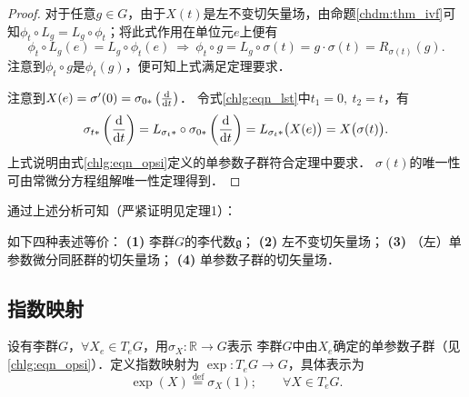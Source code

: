 \begin{proof}
对于任意$g\in G$，由于$X(t)$是左不变切矢量场，由命题\ref{chdm:thm_ivf}可
知$\phi_t\circ L_g = L_g\circ \phi_t$；将此式作用在单位元$e$上便有
\begin{equation}
    \phi_t\circ L_g (e)= L_g\circ \phi_t (e) {\ \Rightarrow \ }
    \phi_t\circ g= L_g\circ \sigma(t) = g\cdot \sigma(t) = R_{\sigma(t)}(g).
\end{equation}
注意到$\phi_t\circ g$是$\phi_t(g)$，便可知上式满足定理要求．

    注意到$X(e)=\sigma'(0)=\sigma_{0*}\left(\frac{{\rm d}}{{\rm d}t}\right)$．
令式\eqref{chlg:eqn_lst}中$t_1=0,\ t_2=t$，有
\begin{equation}
    \sigma_{t*}\left( \frac{{\rm d}}{{\rm d}t}\right) 
    =L_{\sigma_{t}*}\circ\sigma_{0*}\left(\frac{{\rm d}}{{\rm d}t}\right)
    =L_{\sigma_{t}*}\bigl(X(e)\bigr) = X\bigl(\sigma(t)\bigr).
\end{equation}
上式说明由式\eqref{chlg:eqn_opsi}定义的单参数子群符合定理中要求．
$\sigma(t)$的唯一性可由常微分方程组解唯一性定理得到．
\end{proof}

通过上述分析可知（严紧证明见\parencite[\S 2.1]{xiang-hou-meng-2014}定理1）：
\begin{theorem}\label{chlg:thm_la4}
    如下四种表述等价：
    {\bfseries (1)} 李群$G$的李代数$\mathfrak{g}$；
    {\bfseries (2)} 左不变切矢量场；
    {\bfseries (3)} （左）单参数微分同胚群的切矢量场；
    {\bfseries (4)} 单参数子群的切矢量场．
\end{theorem}


  

\subsection{指数映射}\label{chlg:sec_exp-map}

\begin{definition}\label{chlg:def_exp-map}
    设有李群$G$，$\forall X_e \in T_eG$，用$\sigma_X:\mathbb{R}\to G$表示
    李群$G$中由$X_e$确定的单参数子群（见\eqref{chlg:eqn_opsi}）．定义{\heiti 指数映射}为
    $\exp : T_e G \to G$，具体表示为
    \begin{equation}\label{chlg:eqn_exp-map}
        \exp(X) \overset{\mathrm {def}}{=} \sigma_X(1); \qquad \forall X \in T_eG . 
    \end{equation}
\end{definition}


